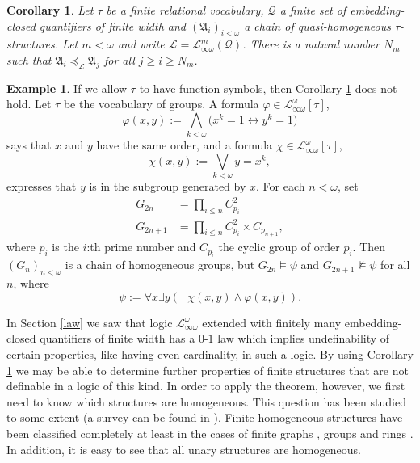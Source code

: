 \documentclass{ndjflart}
\theoremstyle{plain}
\newtheorem{corollary}[conjecture]{Corollary}
\theoremstyle{definition}
\newtheorem{example}[conjecture]{Example}
\numberwithin{equation}{section}
\begin{document}
\begin{corollary}\label{finite2}
Let $\tau$ be a finite relational vocabulary, $\mathcal{Q}$ a finite set of embed\-ding-closed quantifiers of finite width and 
$(\mathfrak{A}_i)_{i<\omega}$ a chain of quasi-ho\-mo\-ge\-neous $\tau$-structures.
Let $m<\omega$ and 
write $\mathcal{L} = \mathcal{L}_{\infty\omega}^m(\mathcal{Q})$.
There is a natural number $N_m$ such that
$\mathfrak{A}_i \preceq_{\mathcal{L}} \mathfrak{A}_j$ for all $j \geq i \geq N_m$.
\end{corollary}

\begin{example}\label{groups}
If we allow $\tau$ to have function symbols, then Corollary \ref{finite2} does not hold.
Let $\tau$ be the vocabulary of groups.
A formula $\varphi \in \mathcal{L}_{\infty\omega}^{\omega}[\tau]$,
\[
	\varphi(x,y) := \bigwedge_{k<\omega}\big(x^k=1 \leftrightarrow y^k=1\big)
\]
says that $x$ and $y$ have the same order, and a formula $\chi \in \mathcal{L}_{\infty\omega}^{\omega}[\tau]$,
\[
	\chi(x,y) := \bigvee_{k<\omega}y = x^k,
\]
expresses that $y$ is in the subgroup generated by $x$.
For each $n<\omega$, set
\begin{align*}
	G_{2n} &= \prod_{i\leq n} C_{p_i}^2 \\
	G_{2n+1} &= \prod_{i\leq n} C_{p_i}^2 \times C_{p_{n+1}},
\end{align*}
where $p_i$ is the $i$:th prime number and $C_{p_i}$ the cyclic group of order $p_i$.
Then $(G_n)_{n<\omega}$ is a chain of homogeneous groups, but $G_{2n} \vDash \psi$ and $G_{2n+1} \nvDash \psi$ for all $n$, where
\[
	\psi := \forall x \exists y(\neg\chi(x,y) \wedge \varphi(x,y)).
\]
\end{example}

In Section \ref{law} we saw that logic $\mathcal{L}^{\omega}_{\infty\omega}$ extended with finitely many em\-bed\-ding-closed quantifiers of finite width has a $0$-$1$ law
which implies undefinability of certain properties, like having even cardinality, in such a logic.
By using Corollary \ref{finite2} we may be able to determine further properties of finite structures that are not definable in 
a logic of this kind.
In order to apply the theorem, however, we first need to know which structures are homogeneous.
This question has been studied to some extent (a survey can be found in \cite{Lachlan:1986}).
Finite homogeneous structures have been classified completely at least in the cases
of finite graphs \cite{Gardiner:1976}, groups \cite{Cherlin:2000} and rings \cite{Saracino:1988}.
In addition, it is easy to see that all unary structures are homogeneous.
\end{document}
